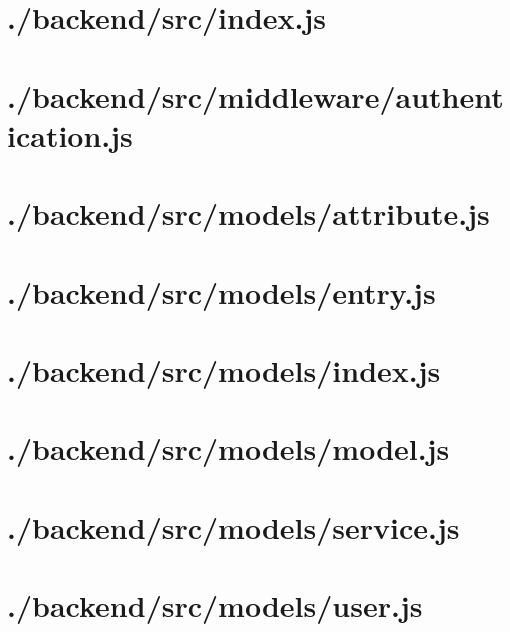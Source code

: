 \documentclass[11pt]{informatics-report}
\begin{document}


\newpage
\section{./backend/src/index.js}


\newpage
\section{./backend/src/middleware/authentication.js}


\newpage
\section{./backend/src/models/attribute.js}


\newpage
\section{./backend/src/models/entry.js}


\newpage
\section{./backend/src/models/index.js}


\newpage
\section{./backend/src/models/model.js}


\newpage
\section{./backend/src/models/service.js}


\newpage
\section{./backend/src/models/user.js}

\end{document}
